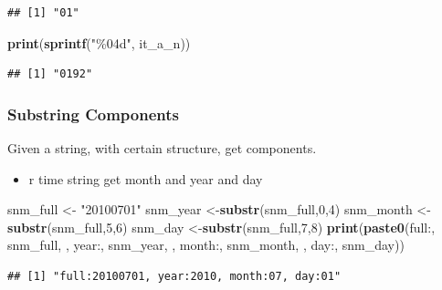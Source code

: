 \documentclass[
]{book}
\newenvironment{Shaded}{\begin{snugshade}}{\end{snugshade}}
\newcommand{\DecValTok}[1]{\textcolor[rgb]{0.00,0.00,0.81}{#1}}
\newcommand{\KeywordTok}[1]{\textcolor[rgb]{0.13,0.29,0.53}{\textbf{#1}}}
\newcommand{\NormalTok}[1]{#1}
\newcommand{\StringTok}[1]{\textcolor[rgb]{0.31,0.60,0.02}{#1}}
\providecommand{\tightlist}{%
  \setlength{\itemsep}{0pt}\setlength{\parskip}{0pt}}
\begin{document}
\begin{verbatim}
## [1] "01"
\end{verbatim}

\begin{Shaded}
\begin{Highlighting}[]
\KeywordTok{print}\NormalTok{(}\KeywordTok{sprintf}\NormalTok{(}\StringTok{"\%04d"}\NormalTok{, it\_a\_n))}
\end{Highlighting}
\end{Shaded}

\begin{verbatim}
## [1] "0192"
\end{verbatim}

\hypertarget{substring-components}{%
\subsubsection{Substring Components}\label{substring-components}}

Given a string, with certain structure, get components.

\begin{itemize}
\tightlist
\item
  r time string get month and year and day
\end{itemize}

\begin{Shaded}
\begin{Highlighting}[]
\NormalTok{snm\_full \textless{}{-}}\StringTok{ "20100701"}
\NormalTok{snm\_year \textless{}{-}}\KeywordTok{substr}\NormalTok{(snm\_full,}\DecValTok{0}\NormalTok{,}\DecValTok{4}\NormalTok{)}
\NormalTok{snm\_month \textless{}{-}}\KeywordTok{substr}\NormalTok{(snm\_full,}\DecValTok{5}\NormalTok{,}\DecValTok{6}\NormalTok{)}
\NormalTok{snm\_day \textless{}{-}}\KeywordTok{substr}\NormalTok{(snm\_full,}\DecValTok{7}\NormalTok{,}\DecValTok{8}\NormalTok{)}
\KeywordTok{print}\NormalTok{(}\KeywordTok{paste0}\NormalTok{(}\StringTok{\textquotesingle{}full:\textquotesingle{}}\NormalTok{, snm\_full, }
             \StringTok{\textquotesingle{}, year:\textquotesingle{}}\NormalTok{, snm\_year, }
             \StringTok{\textquotesingle{}, month:\textquotesingle{}}\NormalTok{, snm\_month,}
             \StringTok{\textquotesingle{}, day:\textquotesingle{}}\NormalTok{, snm\_day))}
\end{Highlighting}
\end{Shaded}

\begin{verbatim}
## [1] "full:20100701, year:2010, month:07, day:01"
\end{verbatim}
\end{document}
